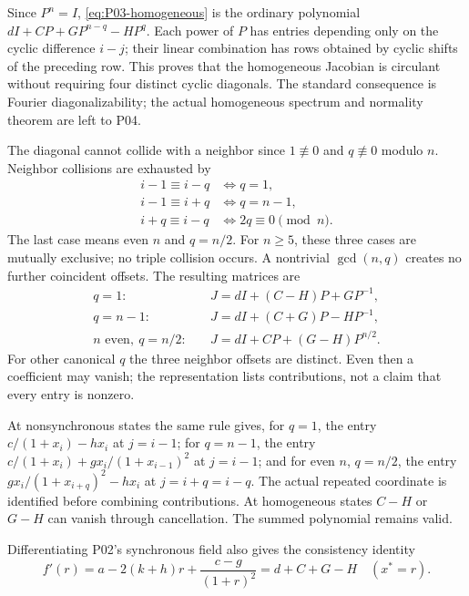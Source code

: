 Since $P^n=I$, \eqref{eq:P03-homogeneous} is the ordinary polynomial
$dI+CP+GP^{n-q}-HP^q$. Each power of $P$ has entries depending
only on the cyclic difference $i-j$; their linear combination has
rows obtained by cyclic shifts of the preceding row. This proves
that the homogeneous Jacobian is circulant without requiring four
distinct cyclic diagonals. The standard consequence is Fourier
 diagonalizability; the actual homogeneous spectrum and normality
 theorem are left to P04.

The diagonal cannot collide with a neighbor since $1\not\equiv0$
and $q\not\equiv0$ modulo $n$. Neighbor collisions are exhausted by
\[
\begin{aligned}
 i-1\equiv i-q&\iff q=1,\\
 i-1\equiv i+q&\iff q=n-1,\\
 i+q\equiv i-q&\iff 2q\equiv0\pmod n.
\end{aligned}
\]
The last case means even $n$ and $q=n/2$. For $n\ge5$, these
three cases are mutually exclusive; no triple collision occurs.
A nontrivial $\gcd(n,q)$ creates no further coincident offsets.
The resulting matrices are
\begin{align}
 q=1:&\quad J=dI+(C-H)P+GP^{-1},
    \label{eq:P03-collision-one}\\
 q=n-1:&\quad J=dI+(C+G)P-HP^{-1},
    \label{eq:P03-collision-last}\\
 n\text{ even},\ q=n/2:&\quad J=dI+CP+(G-H)P^{n/2}.
    \label{eq:P03-collision-half}
\end{align}
For other canonical $q$ the three neighbor offsets are distinct.
Even then a coefficient may vanish; the representation lists
contributions, not a claim that every entry is nonzero.

At nonsynchronous states the same rule gives, for $q=1$, the
entry $c/(1+x_i)-h x_i$ at $j=i-1$; for $q=n-1$, the entry
$c/(1+x_i)+g x_i/(1+x_{i-1})^2$ at $j=i-1$; and for even $n$,
$q=n/2$, the entry $g x_i/(1+x_{i+q})^2-h x_i$ at
$j=i+q=i-q$. The actual repeated coordinate is identified before
combining contributions. At homogeneous states $C-H$ or $G-H$
can vanish through cancellation. The summed polynomial remains valid.

Differentiating P02's synchronous field also gives the consistency identity
\begin{equation}
 f'(r)=a-2(k+h)r+\frac{c-g}{(1+r)^2}
       =d+C+G-H\quad(x^*=r).
 \label{eq:P03-row-sum-check}
\end{equation}
